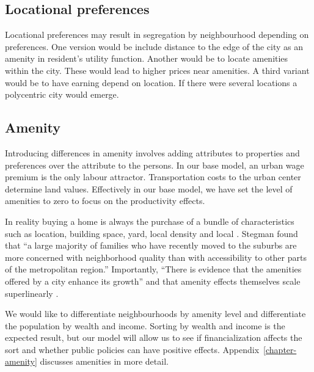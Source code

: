 
\subsection{Locational preferences}
Locational preferences may result in segregation by neighbourhood depending on preferences. One version would be include distance to the edge of the city as an amenity in resident's utility function. Another would be to locate amenities within the city. These would lead to higher prices near amenities. A third variant would be to have earning depend on location. If there were several locations a polycentric city would emerge.

\subsection{Amenity}
Introducing differences in amenity involves  adding attributes to properties and preferences over the attribute to the persons. In our base model, an urban wage premium is the only labour attractor. Transportation costs to the urban center determine land values. Effectively in our base model, we have set the level of amenities to zero to focus on the productivity effects.

In reality buying a home is always the purchase of a bundle of characteristics such as location, building space, yard, local density and local . Stegman  found that ``a large majority of families who have recently moved to the suburbs are more concerned with neighborhood quality than with accessibility to other parts of the metropolitan region.'' Importantly, 
``There is evidence that the amenities offered by a city enhance its growth'' \cite{clarkAmenitiesDriveUrban2002, falckPhantomOperaCultural2011} and that amenity effects themselves scale superlinearly \cite{kraemerCulturalSustainabilityUS2022}.

We would like to differentiate neighbourhoods by amenity level and differentiate the population by wealth and income. Sorting by wealth and income is the expected result, but our model will allow us to  see if financialization affects the sort and whether public policies can have positive effects. Appendix~\ref{chapter-amenity} discusses amenities in more detail.




